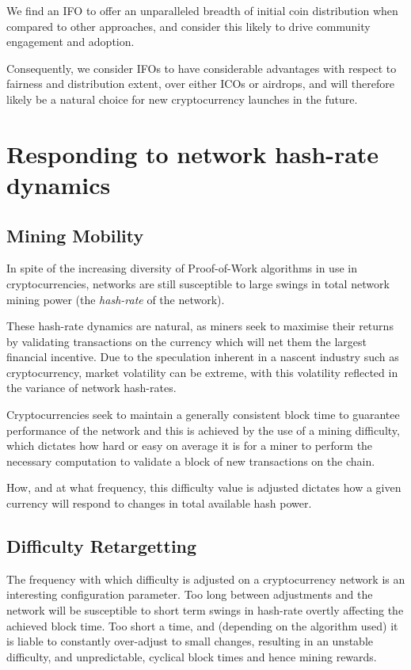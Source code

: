 \documentclass{IOS-Book-Article}
\begin{document}
We find an IFO to offer an unparalleled breadth of initial coin distribution when compared to other approaches, and consider this likely to drive community engagement and adoption.

Consequently, we consider IFOs to have considerable advantages with respect to fairness 
and distribution extent, over either ICOs or airdrops, and will therefore likely be a natural choice
for new cryptocurrency launches in the future.


\section{Responding to network hash-rate dynamics}

\subsection{Mining Mobility}
In spite of the increasing diversity of Proof-of-Work algorithms in use in cryptocurrencies, 
networks are still susceptible to large swings in total network mining power (the \textit{hash-rate}
of the network).

These hash-rate dynamics are natural, as miners seek to maximise their returns by validating
transactions on the currency which will net them the largest financial incentive. Due to the 
speculation inherent in a nascent industry such as cryptocurrency, market volatility can be
extreme, with this volatility reflected in the variance of network hash-rates.

Cryptocurrencies seek to maintain a generally consistent block time to guarantee performance of 
the network and this is achieved by the use of a mining difficulty, which dictates how hard or
easy on average it is for a miner to perform the necessary computation to validate a block of new
transactions on the chain.

How, and at what frequency, this difficulty value is adjusted dictates how a given currency
will respond to changes in total available hash power.

\subsection{Difficulty Retargetting}

The frequency with which difficulty is adjusted on a cryptocurrency network is an interesting
configuration parameter. Too long between adjustments and the network will be susceptible to short term swings
in hash-rate overtly affecting the achieved block time. Too short a time, and (depending on the algorithm used)
it is liable to constantly over-adjust to small changes, resulting in an unstable difficulty, and unpredictable,
cyclical block times and hence mining rewards.
\end{document}
